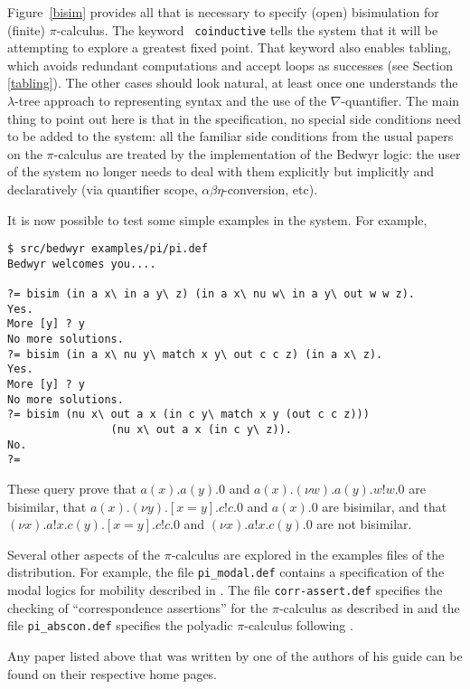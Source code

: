 \documentclass{article}
\begin{document}
Figure~\ref{bisim} provides all that is necessary to specify (open)
bisimulation for (finite) $\pi$-calculus.  The keyword {\tt
coinductive} tells the system that it will be attempting to explore a
greatest fixed point. That keyword also enables tabling, which avoids redundant 
computations and accept loops as successes (see Section \ref{tabling}).
The other cases should look natural, at least
once one understands the $\lambda$-tree approach to representing syntax
and the use of the $\nabla$-quantifier.  The main thing to point out
here is that in the specification, no special side conditions need to
be added to the system: all the familiar side conditions from the
usual papers on the $\pi$-calculus are treated by the implementation
of the Bedwyr logic: the user of the system no longer needs to deal
with them explicitly but implicitly and declaratively (via quantifier
scope, $\alpha\beta\eta$-conversion, etc).

It is now possible to test some simple examples in the system.  For
example,
\begin{verbatim}
$ src/bedwyr examples/pi/pi.def
Bedwyr welcomes you....

?= bisim (in a x\ in a y\ z) (in a x\ nu w\ in a y\ out w w z).
Yes.
More [y] ? y
No more solutions.
?= bisim (in a x\ nu y\ match x y\ out c c z) (in a x\ z).
Yes.
More [y] ? y
No more solutions.
?= bisim (nu x\ out a x (in c y\ match x y (out c c z)))
                (nu x\ out a x (in c y\ z)).
No.
?= 
\end{verbatim}
These query prove that 
$a(x).a(y).0$ and $a(x).(\nu w).a(y).w!w.0$ are bisimilar, 
that
$a(x).(\nu y).[x=y].c!c.0$ and $a(x).0$ are bisimilar, and that 
$(\nu x).a!x.c(y).[x=y].c!c.0$ and 
$(\nu x).a!x.c(y).0$ are not bisimilar.

Several other aspects of the $\pi$-calculus are explored in the
examples files of the distribution.  For example, the file
\verb+pi_modal.def+ contains a specification of the modal logics for
mobility described in \cite{milner93tcs}.  The file
\verb+corr-assert.def+ specifies the checking of ``correspondence
assertions'' for the $\pi$-calculus as described in \cite{gordon03tcs}
and the file \verb+pi_abscon.def+ specifies the polyadic
$\pi$-calculus following \cite{milner99book}.

%



\noindent Any paper listed above that was written by one of the
authors of his guide can be found on their respective home pages.
\end{document}

